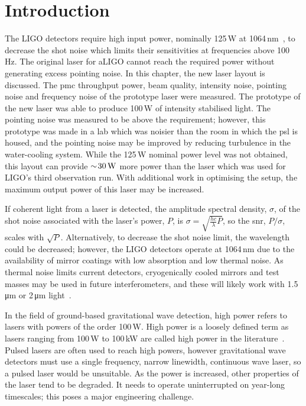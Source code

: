 \section{Introduction}
The LIGO detectors require high input power, nominally 125\,\si{\watt} at 1064\,\si{\nano\metre}~\cite{PSL_requirements}, to decrease the shot noise which limits their sensitivities at frequencies above 100\,\si{\hertz}. The original laser for aLIGO cannot reach the required power without generating excess pointing noise. In this chapter, the new laser layout is discussed. The \gls{pmc} throughput power, beam quality, intensity noise, pointing noise and frequency noise of the prototype laser were measured. The prototype of the new laser was able to produce 100\,\si{\watt} of intensity stabilised light. The pointing noise was measured to be above the requirement; however, this prototype was made in a lab which was noisier than the room in which the \gls{psl} is housed, and the pointing noise may be improved by reducing turbulence in the water-cooling system. While the 125\,\si{\watt} nominal power level was not obtained, this layout can provide $\sim\!30\,\rm{W}$ more power than the laser which was used for LIGO's third observation run. With additional work in optimising the setup, the maximum output power of this laser may be increased.  
\par
If coherent light from a laser is detected, the amplitude spectral density, $\sigma$, of the shot noise associated with the laser's power, $P$, is $\sigma = \sqrt{\frac{hc}{\lambda}P}$, so the \gls{snr}, $P/\sigma$, scales with $\sqrt{P}$. Alternatively, to decrease the shot noise limit, the wavelength could be decreased; however, the LIGO detectors operate at 1064\,\si{\nano\metre} due to the availability of mirror coatings with low absorption and low thermal noise. As thermal noise limits current detectors, cryogenically cooled mirrors and test masses may be used in future interferometers, and these will likely work with 1.5\,\si{\micro\metre} or 2\,\si{\micro\metre} light~\cite{Craig2019}.
\par
In the field of ground-based gravitational wave detection, high power refers to lasers with powers of the order 100\,\si{\watt}. High power is a loosely defined term as lasers ranging from 100\,\si{\watt} to 100\,\si{\kilo\watt} are called high power in the literature~\cite{Shcherbakov2013,Lee2019,Huang2019,Ma2016,Robin2014,Dixneuf2020,Winkelmann2011,Wellmann2019,Buikema2019,Bode2020,Thies2019}. Pulsed lasers are often used to reach high powers, however gravitational wave detectors must use a single frequency, narrow linewidth, continuous wave laser, so a pulsed laser would be unsuitable. As the power is increased, other properties of the laser tend to be degraded. It needs to operate uninterrupted on year-long timescales; this poses a major engineering challenge. 
